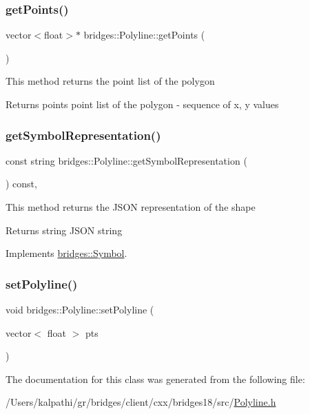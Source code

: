 \subsubsection{\texorpdfstring{get\+Points()}{getPoints()}}
{\footnotesize\ttfamily vector$<$float$>$$\ast$ bridges\+::\+Polyline\+::get\+Points (\begin{DoxyParamCaption}{ }\end{DoxyParamCaption})\hspace{0.3cm}{\ttfamily [inline]}}

This method returns the point list of the polygon

\begin{DoxyReturn}{Returns}
points point list of the polygon -\/ sequence of x, y values 
\end{DoxyReturn}
\mbox{\label{classbridges_1_1_polyline_a850d2f619466b159c7874317f9eaf0a3}} 
\subsubsection{\texorpdfstring{get\+Symbol\+Representation()}{getSymbolRepresentation()}}
{\footnotesize\ttfamily const string bridges\+::\+Polyline\+::get\+Symbol\+Representation (\begin{DoxyParamCaption}{ }\end{DoxyParamCaption}) const\hspace{0.3cm}{\ttfamily [inline]}, {\ttfamily [virtual]}}

This method returns the J\+S\+ON representation of the shape

\begin{DoxyReturn}{Returns}
string J\+S\+ON string 
\end{DoxyReturn}


Implements \mbox{\hyperlink{classbridges_1_1_symbol_ab4dd31fbc736b2e58e8b8bb8446eac73}{bridges\+::\+Symbol}}.

\mbox{\label{classbridges_1_1_polyline_adaae3e064c497291beb1ba3cacb4b9a0}} 
\subsubsection{\texorpdfstring{set\+Polyline()}{setPolyline()}}
{\footnotesize\ttfamily void bridges\+::\+Polyline\+::set\+Polyline (\begin{DoxyParamCaption}\item[{vector$<$ float $>$}]{pts }\end{DoxyParamCaption})\hspace{0.3cm}{\ttfamily [inline]}}



The documentation for this class was generated from the following file\+:\begin{DoxyCompactItemize}
\item 
/\+Users/kalpathi/gr/bridges/client/cxx/bridges18/src/\mbox{\hyperlink{_polyline_8h}{Polyline.\+h}}\end{DoxyCompactItemize}
